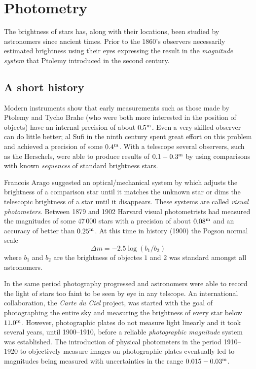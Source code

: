 \chapter{Photometry}

The brightness of stars has, along with their locations, been studied
by astronomers since ancient times. Prior to the 1860's observers
necessarily estimated brightness using their eyes expressing the
result in the {\it magnitude system} that Ptolemy introduced in the
second century. 

\section{A short history}

Modern instruments show that early measurements such as those made by
Ptolemy and Tycho Brahe (who were both more interested in the position
of objects) have an internal precision of about $0.5^{\rm m}$. Even a
very skilled observer can do little better; al Sufi in the ninth
century spent great effort on this problem and achieved a precision of
some $0.4^{\rm m}$. With a telescope several observers, such as the Herschels, were able to
produce results of $0.1-0.3^{\rm m}$ by using comparisons with known
{\it sequences} of standard brightness stars. 

Francois Arago suggested an optical/mechanical system by which adjusts
the brightness of a comparison star until it matches the unknown star
or dims the telescopic brightness of a star until it disappears. These
systems are called  {\it visual photometers}. Between 1879 and 1902
Harvard visual photometrists had measured the magnitudes of some
$47\,000$ stars with a precision of about $0.08^{\rm m}$ and an
accuracy of better than $0.25^{\rm m}$. At this time in history (1900)
the Pogson normal scale
\[
\Delta m=-2.5\log({b_1/b_2})
\]
where $b_1$ and $b_2$ are the brightness of objectes $1$ and $2$ was
standard amongst all astronomers. 

In the same period photography progressed and astronomers were able to
record the light of stars too faint to be seen by eye in any
telscope. An international collaboration, the {\it Carte du Ciel}
project, was started with the goal of photographing the entire sky and
measuring the brightness of every star below $11.0^{\rm m}$. However,
photographic plates do not measure light linearly and it took several
years, until 1900--1910, before a reliable {\it photographic
  magnitude} system was established. The introduction of physical
photometers in the period 1910--1920 to objectively measure images on
photographic plates eventually led to magnitudes being measured with
uncertainties in the range $0.015-0.03^{\rm m}$.

